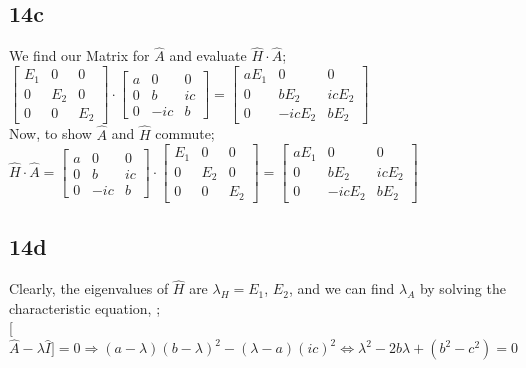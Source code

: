 \documentclass[10pt]{article}
\begin{document}
\subsection*{14c}
We find our Matrix for $\hat{A}$ and evaluate $\hat{H}\cdot\hat{A}$;\\

$\begin{bmatrix}
 E_1 & 0 & 0 \\
 0 & E_2 & 0 \\
 0 & 0 & E_2
\end{bmatrix}
\cdot
\begin{bmatrix}
a & 0 & 0 \\
0 & b & ic \\
0 & -ic & b
\end{bmatrix}
=
\begin{bmatrix}
aE_1 & 0 & 0\\
0 & bE_2 & icE_2\\
0 & -icE_2 & bE_2
\end{bmatrix}$\\

Now, to show $\hat{A}$ and $\hat{H}$ commute;\\

$\hat{H}\cdot\hat{A}=
\begin{bmatrix}
a & 0 & 0 \\
0 & b & ic \\
0 & -ic & b
\end{bmatrix}
\cdot
\begin{bmatrix}
 E_1 & 0 & 0 \\
 0 & E_2 & 0 \\
 0 & 0 & E_2
\end{bmatrix}
=
\begin{bmatrix}
aE_1 & 0 & 0\\
0 & bE_2 & icE_2\\
0 & -icE_2 & bE_2
\end{bmatrix}$\\
\subsection*{14d}
Clearly, the eigenvalues of $\hat{H}$ are $\lambda_H=E_1$, $E_2$, and we can find $\lambda_A$ by solving the characteristic equation, ;\\

[$\hat{A}-\lambda\hat{I}]=0\Rightarrow(a-\lambda)(b-\lambda)^2-(\lambda-a)(ic)^2\Leftrightarrow\lambda^2-2b\lambda+(b^2-c^2)=0$\\
\end{document}
